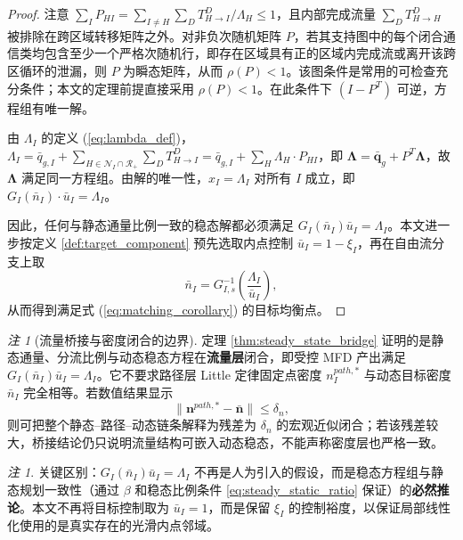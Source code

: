 \documentclass[a4paper,12pt]{article}
\theoremstyle{plain}
\theoremstyle{definition}
\theoremstyle{remark}
\newtheorem{remark}[theorem]{注}
\begin{document}
\begin{proof}
注意 $\sum_I P_{HI} = \sum_{I\ne H}\sum_D T_{H \to I}^D / \Lambda_H \leq 1$，且内部完成流量 $\sum_D T_{H \to H}^D$ 被排除在跨区域转移矩阵之外。对非负次随机矩阵 $P$，若其支持图中的每个闭合通信类均包含至少一个严格次随机行，即存在区域具有正的区域内完成流或离开该跨区循环的泄漏，则 $P$ 为瞬态矩阵，从而 $\rho(P)<1$。该图条件是常用的可检查充分条件；本文的定理前提直接采用 $\rho(P)<1$。在此条件下 $(I-P^T)$ 可逆，方程组有唯一解。

由 $\Lambda_I$ 的定义 (\ref{eq:lambda_def})，$\Lambda_I = \bar{q}_{g,I} + \sum_{H\in\mathcal N_I\cap\mathcal R_+} \sum_D T_{H \to I}^D = \bar{q}_{g,I} + \sum_H \Lambda_H \cdot P_{HI}$，即 $\bm{\Lambda} = \bar{\bm{q}}_g + P^T \bm{\Lambda}$，故 $\bm{\Lambda}$ 满足同一方程组。由解的唯一性，$x_I = \Lambda_I$ 对所有 $I$ 成立，即 $G_I(\bar{n}_I) \cdot \bar{u}_I = \Lambda_I$。

因此，任何与静态通量比例一致的稳态解都必须满足 $G_I(\bar n_I)\bar u_I=\Lambda_I$。本文进一步按定义 \ref{def:target_component} 预先选取内点控制 $\bar u_I=1-\xi_I$，再在自由流分支上取
\begin{equation}
    \bar n_I=G_{I,s}^{-1}\left(\frac{\Lambda_I}{\bar u_I}\right),
\end{equation}
从而得到满足式 (\ref{eq:matching_corollary}) 的目标均衡点。
\end{proof}

\begin{remark}[流量桥接与密度闭合的边界]\label{rem:flow_density_bridge_boundary}
定理 \ref{thm:steady_state_bridge} 证明的是静态通量、分流比例与动态稳态方程在\textbf{流量层}闭合，即受控 MFD 产出满足 $G_I(\bar n_I)\bar u_I=\Lambda_I$。它不要求路径层 Little 定律固定点密度 $n_I^{path,*}$ 与动态目标密度 $\bar n_I$ 完全相等。若数值结果显示
\begin{equation}
    \| \bm n^{path,*}-\bar{\bm n}\|\le \delta_n ,
\end{equation}
则可把整个静态--路径--动态链条解释为残差为 $\delta_n$ 的宏观近似闭合；若该残差较大，桥接结论仍只说明流量结构可嵌入动态稳态，不能声称密度层也严格一致。
\end{remark}

\begin{remark}
关键区别：$G_I(\bar{n}_I)\bar u_I = \Lambda_I$ 不再是人为引入的假设，而是稳态方程组与静态规划一致性（通过 $\beta$ 和稳态比例条件 \ref{eq:steady_static_ratio} 保证）的\textbf{必然推论}。本文不再将目标控制取为 $\bar u_I=1$，而是保留 $\xi_I$ 的控制裕度，以保证局部线性化使用的是真实存在的光滑内点邻域。
\end{remark}
\end{document}
